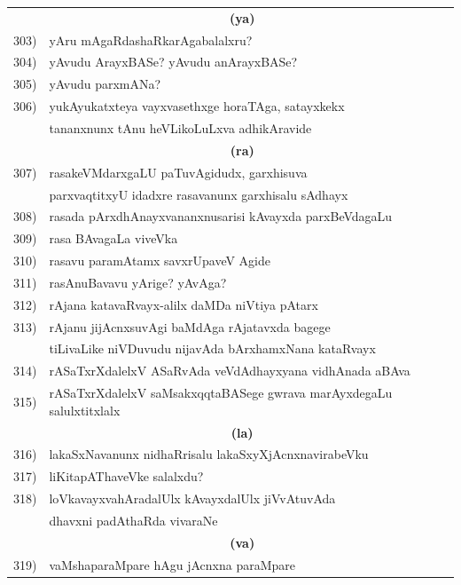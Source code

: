 {\begin{longtable}{@{}cp{7.4cm}r}
     & \multicolumn{1}{c}{\textbf{(ya)}} & \\[0.3cm]
303) & yAru mAgaRdashaRkarAgabalalxru? & \pageref{page24}\\
304)& yAvudu ArayxBASe? yAvudu anArayxBASe? & \pageref{page174}\\
305) & yAvudu parxmANa? & \pageref{page134}\\
306) & yukAyukatxteya vayxvasethxge horaTAga, satayxkekx & \\
     & tananxnunx tAnu heVLikoLuLxva adhikAravide & \pageref{page249}\\[0.3cm]
     & \multicolumn{1}{c}{\textbf{(ra)}} & \\[0.3cm]
307) &  rasakeVMdarxgaLU paTuvAgidudx, garxhisuva & \\
     & parxvaqtitxyU idadxre rasavanunx garxhisalu sAdhayx & \pageref{page222}\\         
308) & rasada pArxdhAnayxvananxnusarisi kAvayxda parxBeVdagaLu & \pageref{page240}\\
309) & rasa BAvagaLa viveVka    & \pageref{page224}\\ 
310) & rasavu paramAtamx savxrUpaveV Agide & \pageref{page222}\\
311) & rasAnuBavavu yArige? yAvAga? &\pageref{page227}\\
312) & rAjana katavaRvayx-alilx daMDa niVtiya pAtarx &\pageref{page92}\\
313) & rAjanu jijAcnxsuvAgi baMdAga rAjatavxda bagege  & \\
     & tiLivaLike niVDuvudu nijavAda bArxhamxNana kataRvayx &\pageref{page253}\\ 
314) & rASaTxrXdalelxV ASaRvAda veVdAdhayxyana vidhAnada aBAva & \pageref{page47a}\\
315) & rASaTxrXdalelxV saMsakxqqtaBASege gwrava marAyxdegaLu salulxtitxlalx & \pageref{page30b}\\[0.3cm]
     & \multicolumn{1}{c}{\textbf{(la)}} & \\[0.3cm]
316) & lakaSxNavanunx nidhaRrisalu lakaSxyXjAcnxnavirabeVku & \pageref{page3}\\
317) & liKitapAThaveVke salalxdu? & \pageref{page123}\\
318) & loVkavayxvahAradalUlx kAvayxdalUlx jiVvAtuvAda & \\
     & dhavxni padAthaRda vivaraNe & \pageref{page235}\\[0.3cm]  
     & \multicolumn{1}{c}{\textbf{(va)}} & \\[0.3cm]
319) & vaMshaparaMpare hAgu jAcnxna paraMpare &  \pageref{page139}\\

\end{longtable}}
